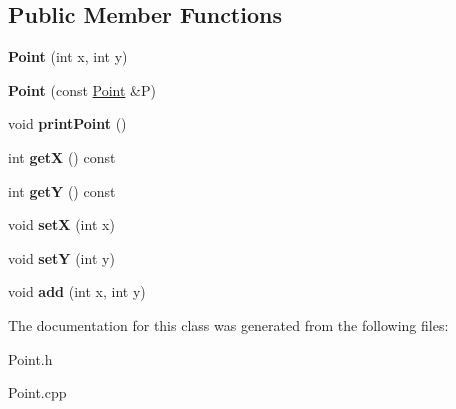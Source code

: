 \subsection*{Public Member Functions}
\begin{DoxyCompactItemize}
\item 
{\bfseries Point} (int x, int y)\hypertarget{classPoint_a001c4958c310b248f5c26037aea38a9c}{}\label{classPoint_a001c4958c310b248f5c26037aea38a9c}

\item 
{\bfseries Point} (const \hyperlink{classPoint}{Point} \&P)\hypertarget{classPoint_a7e32c5a7f878c49ed9f1777b622cc06c}{}\label{classPoint_a7e32c5a7f878c49ed9f1777b622cc06c}

\item 
void {\bfseries print\+Point} ()\hypertarget{classPoint_ad32f6a515be1cf069bf5ea6b89178ae9}{}\label{classPoint_ad32f6a515be1cf069bf5ea6b89178ae9}

\item 
int {\bfseries getX} () const \hypertarget{classPoint_abe622fffc8785b0c2e06cdac681b9837}{}\label{classPoint_abe622fffc8785b0c2e06cdac681b9837}

\item 
int {\bfseries getY} () const \hypertarget{classPoint_a10f31e48e2dbc22e3660ca769b8d5d65}{}\label{classPoint_a10f31e48e2dbc22e3660ca769b8d5d65}

\item 
void {\bfseries setX} (int x)\hypertarget{classPoint_acdc86ab607b2ae8415152883e2629015}{}\label{classPoint_acdc86ab607b2ae8415152883e2629015}

\item 
void {\bfseries setY} (int y)\hypertarget{classPoint_afccad787a359f062efc1af5e935a99ba}{}\label{classPoint_afccad787a359f062efc1af5e935a99ba}

\item 
void {\bfseries add} (int x, int y)\hypertarget{classPoint_a339fe8d180ebbc9079d349c23dc477fe}{}\label{classPoint_a339fe8d180ebbc9079d349c23dc477fe}

\end{DoxyCompactItemize}


The documentation for this class was generated from the following files\+:\begin{DoxyCompactItemize}
\item 
Point.\+h\item 
Point.\+cpp\end{DoxyCompactItemize}
